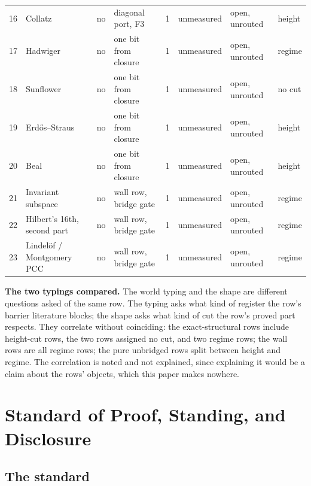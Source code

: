 \documentclass[10pt]{article}
\begin{document}
\begin{table}[!htbp]
\begin{tabularx}{\textwidth}{@{}P{0.02\textwidth} P{0.16\textwidth} P{0.05\textwidth} L P{0.04\textwidth} P{0.10\textwidth} P{0.13\textwidth} P{0.07\textwidth}@{}}
16 & Collatz & no & diagonal port, F3 & 1 & unmeasured & open, unrouted & height \\
17 & Hadwiger & no & one bit from closure & 1 & unmeasured & open, unrouted & regime \\
18 & Sunflower & no & one bit from closure & 1 & unmeasured & open, unrouted & no cut \\
19 & Erdős--Straus & no & one bit from closure & 1 & unmeasured & open, unrouted & height \\
20 & Beal & no & one bit from closure & 1 & unmeasured & open, unrouted & height \\
21 & Invariant subspace & no & wall row, bridge gate & 1 & unmeasured & open, unrouted & regime \\
22 & Hilbert's 16th, second part & no & wall row, bridge gate & 1 & unmeasured & open, unrouted & regime \\
23 & Lindelöf / Montgomery PCC & no & wall row, bridge gate & 1 & unmeasured & open, unrouted & regime \\
\bottomrule
\end{tabularx}
\end{table}

\textbf{The two typings compared.} The world typing and the shape are
different questions asked of the same row. The typing asks what kind of
register the row's barrier literature blocks; the shape asks what kind
of cut the row's proved part respects. They correlate without
coinciding: the exact-structural rows include height-cut rows, the two
rows assigned no cut, and two regime rows; the wall rows are all regime
rows; the pure unbridged rows split between height and regime. The
correlation is noted and not explained, since explaining it would be a
claim about the rows' objects, which this paper makes nowhere.

\hypertarget{standard-of-proof-standing-and-disclosure}{%
\section{Standard of Proof, Standing, and
Disclosure}\label{standard-of-proof-standing-and-disclosure}}

\hypertarget{the-standard}{%
\subsection{The standard}\label{the-standard}}
\end{document}
